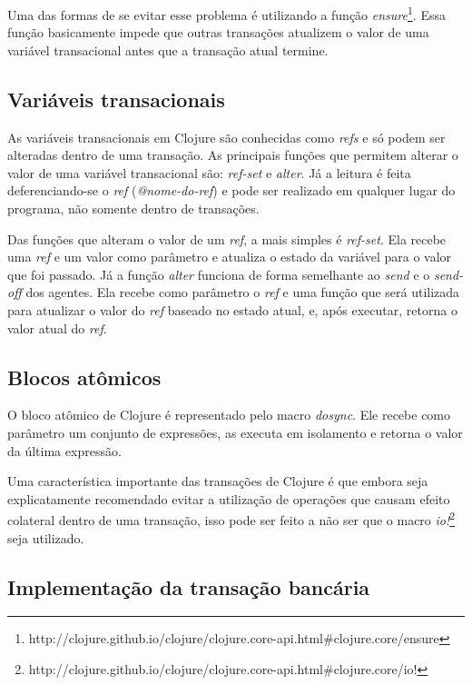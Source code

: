 Uma das formas de se evitar esse problema é utilizando a função \emph{ensure}\footnote{http://clojure.github.io/clojure/clojure.core-api.html\#clojure.core/ensure}. Essa função basicamente impede que outras transações atualizem o valor de uma variável transacional antes que a transação atual termine.


\subsection{Variáveis transacionais}

As variáveis transacionais em Clojure são conhecidas como \emph{refs} e só podem ser alteradas dentro de uma transação. As principais funções que permitem alterar o valor de uma variável transacional são: \emph{ref-set} e \emph{alter}. Já a leitura é feita deferenciando-se o \emph{ref} (\emph{@nome-do-ref}) e pode ser realizado em qualquer lugar do programa, não somente dentro de transações.

Das funções que alteram o valor de um \emph{ref}, a mais simples é \emph{ref-set}. Ela recebe uma \emph{ref} e um valor como parâmetro e atualiza o estado da variável para o valor que foi passado. Já a função \emph{alter} funciona de forma semelhante ao \emph{send} e o \emph{send-off} dos agentes. Ela recebe como parâmetro o \emph{ref} e uma função que será utilizada para atualizar o valor do \emph{ref} baseado no estado atual, e, após executar, retorna o valor atual do \emph{ref}. 

\subsection{Blocos atômicos}

O bloco atômico de Clojure é representado pelo macro \emph{dosync}. Ele recebe como parâmetro um conjunto de expressões, as executa em isolamento e retorna o valor da última expressão.

Uma característica importante das transações de Clojure é que embora seja explicatamente recomendado evitar a utilização de operações que causam efeito colateral dentro de uma transação, isso pode ser feito a não ser que o macro \emph{io!}\footnote{http://clojure.github.io/clojure/clojure.core-api.html\#clojure.core/io!} seja utilizado.

\subsection{Implementação da transação bancária}

